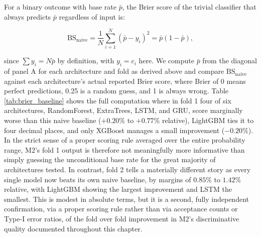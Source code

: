 \documentclass[12pt, a4paper]{article}
\begin{document}
\medskip

For a binary outcome with base rate $\bar p$, the Brier score of the trivial classifier that always predicts $\bar p$ regardless of input is:

\begin{equation}
\text{BS}_{\text{naive}} = \frac{1}{N}\sum_{i=1}^{N} (\bar p - y_i)^2 = \bar p(1-\bar p),
\label{eq:naive_brier}
\end{equation}

since $\sum y_i = N\bar p$ by definition, with $y_i = c_i$ here. We compute $\bar p$ from the diagonal of panel A for each architecture and fold as derived above and compare 
$\text{BS}_{\text{naive}}$ against each architecture's actual reported Brier score, where Brier of 0 means perfect predictions, 0.25 is a random guess, and 1 is always wrong. 
Table \ref{tab:brier_baseline} shows the full computation where in fold 1 four of six architectures, RandomForest, ExtraTrees, LSTM, and GRU, score marginally worse than this 
naive baseline ($+0.20\%$ to $+0.77\%$ relative), LightGBM ties it to four decimal places, and only XGBoost manages a small improvement ($-0.20\%$). 
In the strict sense of a proper scoring rule averaged over the entire probability range, M2's fold 1 output is therefore not meaningfully more informative than simply guessing 
the unconditional base rate for the great majority of architectures tested.
In contrast, fold 2 tells a materially different story as every single model now beats its own naive baseline, by margins of $0.85\%$ to $1.42\%$ relative, with LightGBM showing 
the largest improvement and LSTM the smallest. This is modest in absolute terms, but it is a second, fully independent confirmation, via a proper scoring rule rather than 
via acceptance counts or Type-I error ratios, of the fold over fold improvement in M2's discriminative quality documented throughout this chapter.
\end{document}
